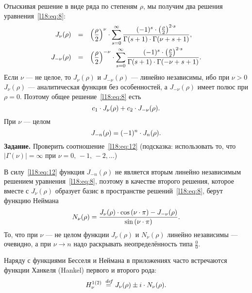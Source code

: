Отыскивая решение в виде ряда по степеням $\rho$, мы получим два решения уравнения~\eqref{l18:eq:8}:
\begin{equation*}
	\hfill\begin{array}{rcl}  J_{\nu}(\rho)&=&\displaystyle\left(\frac{\rho}{2}\right)^{\nu}\cdot\sum\limits_{s=0}^{\infty}\dfrac{(-1)^s\cdot\left(\frac{\rho}{2}\right)^{2\cdot s}}{\Gamma(s+1)\cdot\Gamma(\nu+s+1)},\\[12pt]  J_{-\nu}(\rho)&=&\displaystyle\left(\frac{\rho}{2}\right)^{-\nu}\cdot\sum\limits_{s=0}^{\infty}\dfrac{(-1)^s\cdot\left(\frac{\rho}{2}\right)^{2\cdot s}}{\Gamma(s+1)\cdot\Gamma(-\nu+s+1)}.
	\end{array}\hfill
\end{equation*} 
Если $\nu$ --- не целое, то $J_{\nu}(\rho)$ и $J_{-\nu}(\rho)$ --- линейно независимы, ибо при $\nu>0$ $J_{\nu}(\rho)$ --- аналитическая функция без особенностей, а $J_{-\nu}(\rho)$ имеет полюс при $\rho=0$. Поэтому общее решение~\eqref{l18:eq:8} есть
\begin{equation*}
	\hfill c_1\cdot J_{\nu}(\rho)+c_2\cdot J_{-\nu}(\rho).\hfill
\end{equation*} 
При $\nu$ --- целом 
\begin{equation}\label{l18:eq:12}
	\hfill J_{-n}(\rho)=(-1)^{n}\cdot J_n(\rho).\hfill
\end{equation}
\vspace{0.2cm}
\noindent\textbf{Задание. }Проверить соотношение~\eqref{l18:eq:12} (подсказка: использовать то, что $|\Gamma(\nu)|=\infty$ при $\nu=0,\,-1,\,-2,\ldots$)

\noindent В силу~\eqref{l18:eq:12} функция $J_{-n}(\rho)$ не является вторым линейно независимым решением уравнения~\eqref{l18:eq:8}, поэтому в качестве второго решения, которое вместе с $J_{\nu}(\rho)$ образует базис в пространстве решений~\eqref{l18:eq:8}, берут функцию Неймана
\begin{equation*}
	\hfill N_{\nu}(\rho)=\dfrac{J_{\nu}(\rho)\cdot\cos\left(\nu\cdot\pi\right)-J_{-\nu}(\rho)}{\sin\left(\nu\cdot\pi\right)}.\hfill
\end{equation*}
То, что при $\nu$ --- не целом функции $J_{\nu}(\rho)$ и $N_{\nu}(\rho)$ линейно независимы --- очевидно, а при $\nu\to n$ надо раскрывать неопределённость типа $\frac{0}{0}$.

Наряду с функциями Бесселя и Неймана в приложениях часто встречаются функции Ханкеля (Hankel) первого и второго рода:
\begin{equation*}
	\hfill H_{\nu}^{1(2)}\eqdef J_{\nu}(\rho)\pm i\cdot N_{\nu}(\rho).\hfill
\end{equation*}


